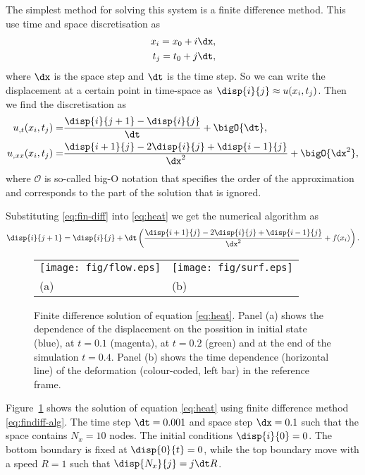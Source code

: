 \documentclass[twoside,a4paper,12pt]{article}
\newcommand{\figref}[1]{Figure~\ref{#1}}
\newcommand{\+}[2]{\newcommand#1{{\color{\notcolor}#2}}}
\newcommand{\1}[2]{\newcommand{#1}[1]{{\color{\notcolor}#2}}}
\newcommand{\2}[2]{\newcommand{#1}[2]{{\color{\notcolor}#2}}}
\begin{document}
The simplest method for solving this system is a finite difference
method. This use time and space discretisation as
%
\begin{subequations}
  \begin{align}
    x_i = x_0 + i\dx,\\
    t_j = t_0 + j\dt,
  \end{align} \label{eq:discr}
\end{subequations}
%
where $\dx$ is the space step and $\dt$ is the time step.  So we can
write the displacement at a certain point in time-space as
$\disp{i}{j} \approx u(x_i,t_j)$. Then we find the discretisation as
%
\begin{subequations}
  \begin{align}
    u_{,t}(x_i,t_j)  =& \frac{\disp{i}{j+1} - \disp{i}{j}}{\dt} + \bigO{\dt}, \\
    u_{,xx}(x_i,t_j) =& \frac{\disp{i+1}{j} - 2\disp{i}{j} + \disp{i-1}{j}}{\dx^2} + \bigO{\dx^2},
  \end{align}\label{eq:fin-diff}
\end{subequations}
%
where $\mathcal{O}$ is so-called big-O notation that specifies the
order of the approximation and corresponds to the part of the solution
that is ignored.

Substituting \eqref{eq:fin-diff} into \eqref{eq:heat} we get the
numerical algorithm as
%
\begin{align}
\disp{i}{j+1}  =   \disp{i}{j} + \dt\left(\frac{\disp{i+1}{j} - 2\disp{i}{j} + \disp{i-1}{j}}{\dx^2}   + f(x_i) \right). \label{eq:findiff-alg}
\end{align}

\begin{figure}
  \centering
  \begin{tabular}{l@{}l}
    \texttt{[image: fig/flow.eps]}&
                                                     \texttt{[image: fig/surf.eps]}\\
    (a)&(b)
  \end{tabular}
  \caption{Finite difference solution of equation
    \eqref{eq:heat}. Panel (a) shows the dependence of the
    displacement on the possition in initial state (blue), at $t=0.1$
    (magenta), at $t=0.2$ (green) and at the end of the simulation
    $t=0.4$.  Panel (b) shows the time dependence (horizontal line) of
    the deformation (colour-coded, left bar) in the reference frame.}
  \label{fig:findiff-heat}
\end{figure}

\figref{fig:findiff-heat} shows the solution of equation
\eqref{eq:heat} using finite difference method
\eqref{eq:findiff-alg}. The time step $\dt=0.001$ and space step
$\dx = 0.1$ such that the space contains $N_x=10$ nodes. The initial
conditions $\disp{i}{0} = 0$. The bottom boundary is fixed at
$\disp{0}{t} = 0$, while the top boundary move with a speed $R=1$ such
that $\disp{N_x}{j} = j \dt R$.


\end{document}

